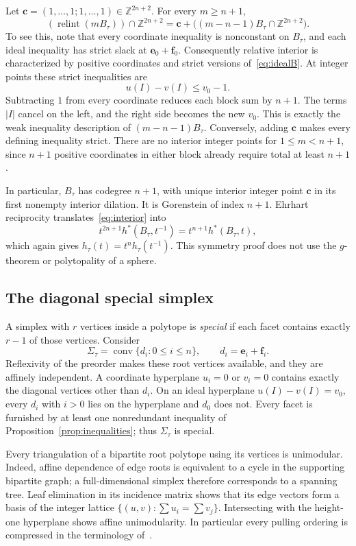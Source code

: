 \documentclass[11pt]{article}
\numberwithin{equation}{section}
\theoremstyle{definition}
\newcommand{\Z}{\mathbb Z}
\newcommand{\conv}{\operatorname{conv}}
\newcommand{\relint}{\operatorname{relint}}
\newcommand{\ee}{\mathbf e}
\newcommand{\ff}{\mathbf f}
\begin{document}
Let $\mathbf c=(1,\ldots,1;1,\ldots,1)\in\Z^{2n+2}$. For every $m\geq n+1$,
\begin{equation}
 (\relint(mB_\tau))\cap\Z^{2n+2}
 =\mathbf c+\bigl((m-n-1)B_\tau\cap\Z^{2n+2}\bigr).\label{eq:interior}
\end{equation}
To see this, note that every coordinate inequality is nonconstant on $B_\tau$,
and each ideal inequality has strict slack at $\ee_0+\ff_0$.
Consequently relative interior is characterized by positive coordinates and
strict versions of~\eqref{eq:idealB}. At integer points these strict
inequalities are
\[
 u(I)-v(I)\leq v_0-1.
\]
Subtracting $1$ from every coordinate reduces each block sum by $n+1$.
The terms $|I|$ cancel on the left, and the right side becomes the new
$v_0$. This is exactly the weak inequality description of
$(m-n-1)B_\tau$. Conversely, adding $\mathbf c$ makes every defining
inequality strict. There are no interior integer points for
$1\leq m<n+1$, since $n+1$ positive coordinates in either block already
require total at least $n+1$.

In particular, $B_\tau$ has codegree $n+1$, with unique interior integer point
$\mathbf c$ in its first nonempty interior dilation. It is Gorenstein of index
$n+1$. Ehrhart reciprocity translates~\eqref{eq:interior} into
\[
 t^{2n+1}h^*(B_\tau,t^{-1})=t^{n+1}h^*(B_\tau,t),
\]
which again gives $h_\tau(t)=t^nh_\tau(t^{-1})$.
This symmetry proof does not use the $g$-theorem or polytopality of a sphere.

\subsection{The diagonal special simplex}

A simplex with $r$ vertices inside a polytope is \emph{special} if each facet
contains exactly $r-1$ of those vertices. Consider
\begin{equation}
 \Sigma_\tau=\conv\{d_i:0\leq i\leq n\},
 \qquad d_i=\ee_i+\ff_i.\label{eq:diagonal}
\end{equation}
Reflexivity of the preorder makes these root vertices available, and they are
affinely independent. A coordinate hyperplane $u_i=0$ or $v_i=0$ contains
exactly the diagonal vertices other than $d_i$. On an ideal hyperplane
$u(I)-v(I)=v_0$, every $d_i$ with $i>0$ lies on the hyperplane and $d_0$ does
not. Every facet is furnished by at least one nonredundant inequality of
Proposition~\ref{prop:inequalities}; thus $\Sigma_\tau$ is special.

Every triangulation of a bipartite root polytope using its vertices is
unimodular. Indeed, affine dependence of edge roots is equivalent to a cycle
in the supporting bipartite graph; a full-dimensional simplex therefore
corresponds to a spanning tree. Leaf elimination in its incidence matrix shows
that its edge vectors form a basis of the integer lattice
$\{(u,v):\sum u_i=\sum v_j\}$. Intersecting with the height-one hyperplane
shows affine unimodularity. In particular every pulling ordering is compressed
in the terminology of~\cite{AthSpecial}.
\end{document}
